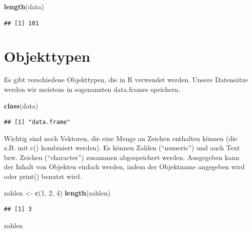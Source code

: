 \documentclass[
]{book}
\newenvironment{Shaded}{\begin{snugshade}}{\end{snugshade}}
\newcommand{\DecValTok}[1]{\textcolor[rgb]{0.00,0.00,0.81}{#1}}
\newcommand{\KeywordTok}[1]{\textcolor[rgb]{0.13,0.29,0.53}{\textbf{#1}}}
\newcommand{\NormalTok}[1]{#1}
\newcommand{\StringTok}[1]{\textcolor[rgb]{0.31,0.60,0.02}{#1}}
\begin{document}
\begin{Shaded}
\begin{Highlighting}[]
\KeywordTok{length}\NormalTok{(data)}
\end{Highlighting}
\end{Shaded}

\begin{verbatim}
## [1] 101
\end{verbatim}

\hypertarget{objekttypen}{%
\section{Objekttypen}\label{objekttypen}}

Es gibt verschiedene Objekttypen, die in R verwendet werden. Unsere Datensätze werden wir meistens in sogenannten data.frames speichern.

\begin{Shaded}
\begin{Highlighting}[]
\KeywordTok{class}\NormalTok{(data)}
\end{Highlighting}
\end{Shaded}

\begin{verbatim}
## [1] "data.frame"
\end{verbatim}

Wichtig sind noch Vektoren, die eine Menge an Zeichen enthalten können (die z.B. mit c() kombiniert werden). Es können Zahlen (``numeric'') und auch Text bzw. Zeichen (``character'') zusammen abgespeichert werden. Ausgegeben kann der Inhalt von Objekten einfach werden, indem der Objektname angegeben wird oder print() benutzt wird.

\begin{Shaded}
\begin{Highlighting}[]
\NormalTok{zahlen <-}\StringTok{ }\KeywordTok{c}\NormalTok{(}\DecValTok{1}\NormalTok{, }\DecValTok{2}\NormalTok{, }\DecValTok{4}\NormalTok{)}
\KeywordTok{length}\NormalTok{(zahlen)}
\end{Highlighting}
\end{Shaded}

\begin{verbatim}
## [1] 3
\end{verbatim}

\begin{Shaded}
\begin{Highlighting}[]
\NormalTok{zahlen}
\end{Highlighting}
\end{Shaded}
\end{document}
